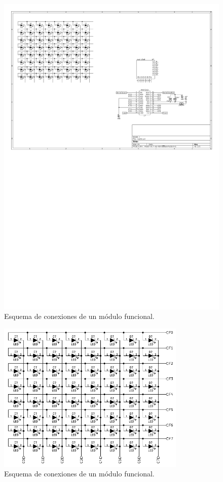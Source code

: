 \begin{figure}[ht!]
	\begin{center}
		\includegraphics[width=\textwidth]{imagenes/hw/moduloEsquematico}
		\caption{Esquema de conexiones de un módulo funcional.}
		\label{fig:hw-moduloEsquematico}
	\end{center}
\end{figure}

\begin{figure}[ht!]
	\begin{center}
		\includegraphics[width=0.8\textwidth]{imagenes/hw/moduloLED}
		\caption{Esquema de conexiones de un módulo funcional.}
		\label{fig:hw-moduloLED}
	\end{center}
\end{figure}

